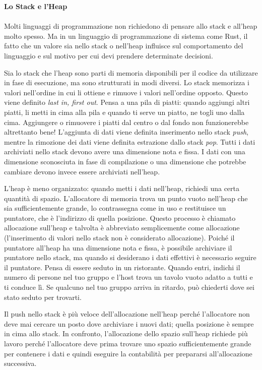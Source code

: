 \documentclass[11pt,a4paper]{article}
\begin{document}
\begin{mdframed}[hidealllines=true,backgroundcolor=blue!20,innerleftmargin=3pt,innerrightmargin=3pt,leftmargin=-5pt,rightmargin=-5pt]
\textbf{Lo Stack e l'Heap}\\
\\
Molti linguaggi di programmazione non richiedono di pensare allo stack e all’heap molto spesso. Ma in un linguaggio di programmazione di sistema come Rust, il fatto che un valore sia nello stack o nell'heap influisce sul comportamento del linguaggio e sul motivo per cui devi prendere determinate decisioni. 

Sia lo stack che l'heap sono parti di memoria disponibili per il codice da utilizzare in fase di esecuzione, ma sono strutturati in modi diversi. Lo stack memorizza i valori nell'ordine in cui li ottiene e rimuove i valori nell'ordine opposto. Questo viene definito \textit{last in, first out}. Pensa a una pila di piatti: quando aggiungi altri piatti, li metti in cima alla pila e quando ti serve un piatto, ne togli uno dalla cima. Aggiungere o rimuovere i piatti dal centro o dal fondo non funzionerebbe altrettanto bene! L'aggiunta di dati viene definita inserimento nello stack \textit{push}, mentre la rimozione dei dati viene definita estrazione dallo stack \textit{pop}. Tutti i dati archiviati nello stack devono avere una dimensione nota e fissa. I dati con una dimensione sconosciuta in fase di compilazione o una dimensione che potrebbe cambiare devono invece essere archiviati nell'heap.

L'heap è meno organizzato: quando metti i dati nell'heap, richiedi una certa quantità di spazio. L'allocatore di memoria trova un punto vuoto nell'heap che sia sufficientemente grande, lo contrassegna come in uso e restituisce un puntatore, che è l'indirizzo di quella posizione. Questo processo è chiamato allocazione sull'heap e talvolta è abbreviato semplicemente come allocazione (l'inserimento di valori nello stack non è considerato allocazione). Poiché il puntatore all'heap ha una dimensione nota e fissa, è possibile archiviare il puntatore nello stack, ma quando si desiderano i dati effettivi è necessario seguire il puntatore. Pensa di essere seduto in un ristorante. Quando entri, indichi il numero di persone nel tuo gruppo e l'host trova un tavolo vuoto adatto a tutti e ti conduce lì. Se qualcuno nel tuo gruppo arriva in ritardo, può chiederti dove sei stato seduto per trovarti.

Il push nello stack è più veloce dell'allocazione nell'heap perché l'allocatore non deve mai cercare un posto dove archiviare i nuovi dati; quella posizione è sempre in cima allo stack. In confronto, l'allocazione dello spazio sull'heap richiede più lavoro perché l'allocatore deve prima trovare uno spazio sufficientemente grande per contenere i dati e quindi eseguire la contabilità per prepararsi all'allocazione successiva.


\end{mdframed}
\end{document}
